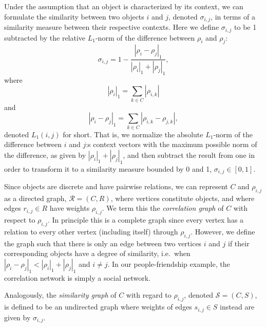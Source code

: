 \documentclass[conference]{IEEEtran}
\newcommand{\comment}[1]{}
\newcommand{\rn}[1]{\rho_{#1}}
\newcommand{\rns}[1]{|\rn{#1}|_1}
\newcommand{\sy}[1]{\sigma_{#1}}
\newcommand{\nm}[1]{L_1(#1)}
\newcommand{\dnm}[2]{|\rn{#1}-\rn{#2}|_1}
\begin{document}
Under the assumption that an object is characterized by its context, we can formulate the
similarity between two objects $i$ and $j$, denoted $\sy{i,j}$, in terms of a similarity measure between their
respective contexts.
Here we define $\sy{i,j}$ to be 1 subtracted by the relative $L_1$-norm of the difference between $\rn{i}$ and $\rn{j}$:
\begin{equation}\label{eq:sim}
\sy{i,j} = 1 - \frac{\dnm{i}{j}}{\rns{i} + \rns{j}},
\end{equation}
where
\begin{equation}\label{eq:totrel}
\rns{i} = \sum_{k \in C} | \rn{i,k}|
\end{equation}
and
\begin{equation}\label{}
\dnm{i}{j} =  \sum_{k \in C} | \rn{i,k} - \rn{j,k} |,
\end{equation}
denoted $\nm{i,j}$ for short.
That is, we normalize the absolute $L_1$-norm of the difference between $i$ and $j$:s context vectors with the maximum
possible norm of the difference, as given by $\rns{i} + \rns{j}$, and then subtract the result from one in order to
transform it to a similarity measure bounded by 0 and 1, $\sy{i,j} \in [0, 1]$.%

Since objects are discrete and have pairwise relations, we can represent $C$ and $\rn{i,j}$ as a directed graph,
$\mathcal{R} = (C, R)$, where vertices constitute objects, and where edges $r_{i,j} \in R$ have weights $\rn{i,j}$. We
term this the \emph{correlation graph} of $C$ with respect to $\rn{i,j}$. In principle this is a complete graph since
every vertex has a relation to every other vertex (including itself) through $\rn{i,j}$. However, we define the graph
such that there is only an edge between two vertices $i$ and $j$ if their corresponding objects have a degree of
similarity, i.e.\ when $\dnm{i}{j} < \rns{i} + \rns{j}$ and $i \neq j$. In our people-friendship example, the correlation network is simply a social network.

Analogously, the \emph{similarity graph} of $C$ with regard to $\rn{i,j}$, denoted $\mathcal{S} = (C, S)$, is defined
to be an undirected graph where weights of edges $s_{i,j} \in S$ instead are given by $\sy{i,j}$. %
\end{document}
